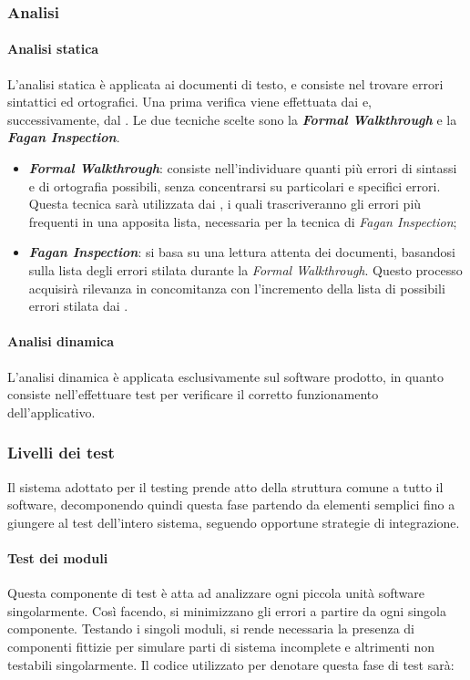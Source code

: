 		\subsubsection{Analisi}

			\paragraph{Analisi statica}
			L'analisi statica è applicata ai documenti di testo, e consiste nel trovare errori sintattici ed ortografici. Una prima verifica viene effettuata dai \textit{\Vers} e, successivamente, dal \textit{\RdP}. Le due tecniche scelte sono la \textbf{\textit{Formal Walkthrough}} e la \textbf{\textit{Fagan Inspection}}.
			\begin{itemize}
				\item \textbf{\textit{Formal Walkthrough}}: consiste nell'individuare quanti più errori di sintassi e di ortografia possibili, senza concentrarsi su particolari e specifici errori. Questa tecnica sarà utilizzata dai \textit{\Vers}, i quali trascriveranno gli errori più frequenti in una apposita lista, necessaria per la tecnica di \textit{Fagan Inspection};
				\item \textbf{\textit{Fagan Inspection}}: si basa su una lettura attenta dei documenti, basandosi sulla lista degli errori stilata durante la \textit{Formal Walkthrough}. Questo processo acquisirà rilevanza in concomitanza con l'incremento della lista di possibili errori stilata dai \textit{\Vers}.
			\end{itemize}

			\paragraph{Analisi dinamica}
			L'analisi dinamica è applicata esclusivamente sul software prodotto, in quanto consiste nell'effettuare test per verificare il corretto funzionamento dell'applicativo.
	
			
		\subsubsection{Livelli dei test}
		Il sistema adottato per il testing prende atto della struttura comune a tutto il software, decomponendo quindi questa fase partendo da elementi semplici fino a giungere al test dell'intero sistema, seguendo opportune strategie di integrazione.
		
		\paragraph{Test dei moduli}
		Questa componente di test è atta ad analizzare ogni piccola unità software singolarmente. Così facendo, si minimizzano gli errori a partire da ogni singola componente. Testando i singoli moduli, si rende necessaria la presenza di componenti fittizie per simulare parti di sistema incomplete e altrimenti non testabili singolarmente. Il codice utilizzato per denotare questa fase di test sarà:
		
